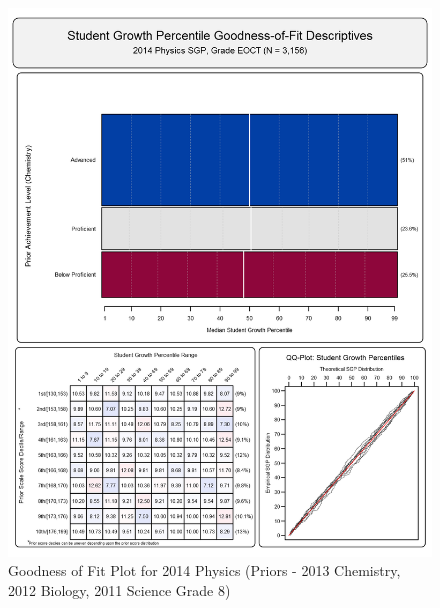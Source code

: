 \documentclass[12pt]{article}
\begin{document}
\begin{figure}[htbp]
\centering
\includegraphics{../img/Goodness_of_Fit/PHYSICS.2014/2014_PHYSICS_EOCT;2013_CHEMISTRY_EOCT;2012_BIOLOGY_EOCT;2011_SCIENCE_8.png}
\caption{Goodness of Fit Plot for 2014 Physics (Priors - 2013 Chemistry,
2012 Biology, 2011 Science Grade 8)}
\end{figure}
\end{document}
